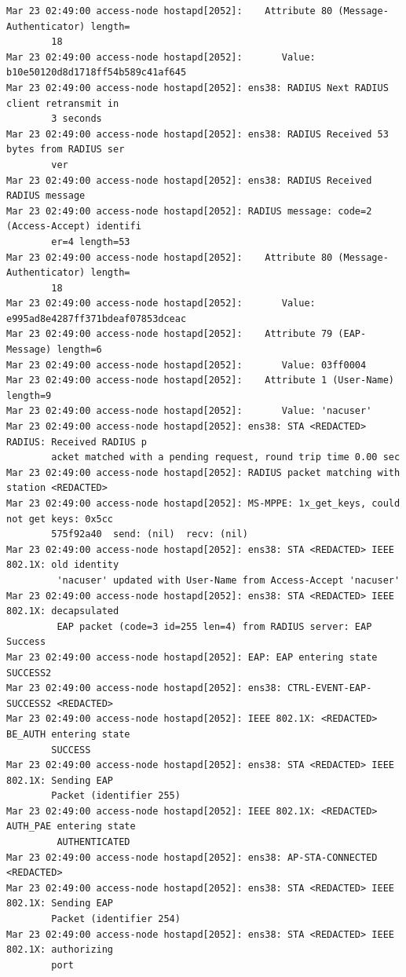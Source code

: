 \documentclass[11pt]{article}
\begin{document}
\begin{verbatim}
Mar 23 02:49:00 access-node hostapd[2052]:    Attribute 80 (Message-Authenticator) length=
        18
Mar 23 02:49:00 access-node hostapd[2052]:       Value: b10e50120d8d1718ff54b589c41af645
Mar 23 02:49:00 access-node hostapd[2052]: ens38: RADIUS Next RADIUS client retransmit in 
        3 seconds
Mar 23 02:49:00 access-node hostapd[2052]: ens38: RADIUS Received 53 bytes from RADIUS ser
        ver
Mar 23 02:49:00 access-node hostapd[2052]: ens38: RADIUS Received RADIUS message
Mar 23 02:49:00 access-node hostapd[2052]: RADIUS message: code=2 (Access-Accept) identifi
        er=4 length=53
Mar 23 02:49:00 access-node hostapd[2052]:    Attribute 80 (Message-Authenticator) length=
        18
Mar 23 02:49:00 access-node hostapd[2052]:       Value: e995ad8e4287ff371bdeaf07853dceac
Mar 23 02:49:00 access-node hostapd[2052]:    Attribute 79 (EAP-Message) length=6
Mar 23 02:49:00 access-node hostapd[2052]:       Value: 03ff0004
Mar 23 02:49:00 access-node hostapd[2052]:    Attribute 1 (User-Name) length=9
Mar 23 02:49:00 access-node hostapd[2052]:       Value: 'nacuser'
Mar 23 02:49:00 access-node hostapd[2052]: ens38: STA <REDACTED> RADIUS: Received RADIUS p
        acket matched with a pending request, round trip time 0.00 sec
Mar 23 02:49:00 access-node hostapd[2052]: RADIUS packet matching with station <REDACTED>
Mar 23 02:49:00 access-node hostapd[2052]: MS-MPPE: 1x_get_keys, could not get keys: 0x5cc
        575f92a40  send: (nil)  recv: (nil)
Mar 23 02:49:00 access-node hostapd[2052]: ens38: STA <REDACTED> IEEE 802.1X: old identity
         'nacuser' updated with User-Name from Access-Accept 'nacuser'
Mar 23 02:49:00 access-node hostapd[2052]: ens38: STA <REDACTED> IEEE 802.1X: decapsulated
         EAP packet (code=3 id=255 len=4) from RADIUS server: EAP Success
Mar 23 02:49:00 access-node hostapd[2052]: EAP: EAP entering state SUCCESS2
Mar 23 02:49:00 access-node hostapd[2052]: ens38: CTRL-EVENT-EAP-SUCCESS2 <REDACTED>
Mar 23 02:49:00 access-node hostapd[2052]: IEEE 802.1X: <REDACTED> BE_AUTH entering state 
        SUCCESS
Mar 23 02:49:00 access-node hostapd[2052]: ens38: STA <REDACTED> IEEE 802.1X: Sending EAP 
        Packet (identifier 255)
Mar 23 02:49:00 access-node hostapd[2052]: IEEE 802.1X: <REDACTED> AUTH_PAE entering state
         AUTHENTICATED
Mar 23 02:49:00 access-node hostapd[2052]: ens38: AP-STA-CONNECTED <REDACTED>
Mar 23 02:49:00 access-node hostapd[2052]: ens38: STA <REDACTED> IEEE 802.1X: Sending EAP 
        Packet (identifier 254)
Mar 23 02:49:00 access-node hostapd[2052]: ens38: STA <REDACTED> IEEE 802.1X: authorizing 
        port

\end{verbatim}
\end{document}

